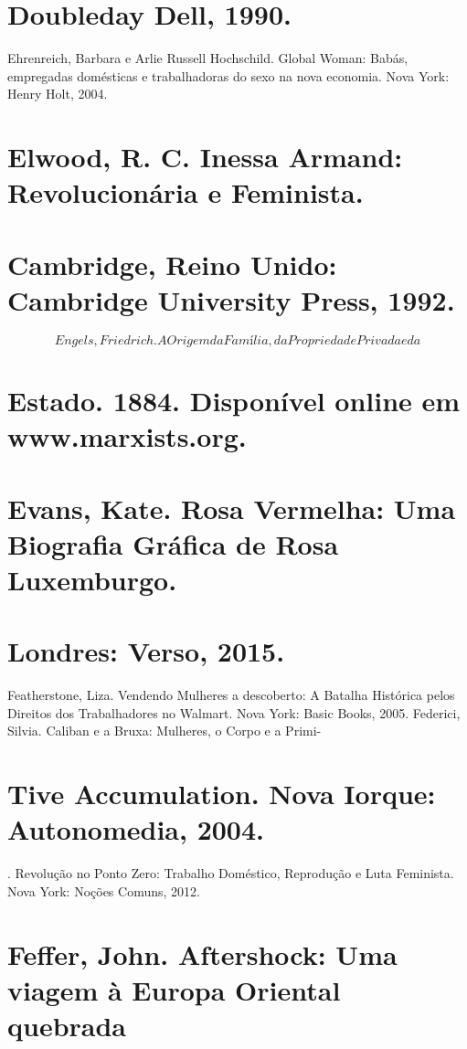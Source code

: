 \section{Doubleday Dell, 1990.}
 \par 
Ehrenreich, Barbara e Arlie Russell Hochschild. Global Woman: Babás, empregadas domésticas e trabalhadoras do sexo na nova economia. Nova York: Henry Holt, 2004.
 \par 
\section{Elwood, R. C. Inessa Armand: Revolucionária e Feminista.}
 \par 
\section{Cambridge, Reino Unido: Cambridge University Press, 1992.}
 \par 
\[Engels, Friedrich. A Origem da Família, da Propriedade Privada e da\]
 \par 
\section{Estado. 1884. Disponível online em www.marxists.org.}
 \par 
\section{Evans, Kate. Rosa Vermelha: Uma Biografia Gráfica de Rosa Luxemburgo.}
 \par 
\section{Londres: Verso, 2015.}
 \par 
Featherstone, Liza. Vendendo Mulheres a descoberto: A Batalha Histórica pelos Direitos dos Trabalhadores no Walmart. Nova York: Basic Books, 2005. Federici, Silvia. Caliban e a Bruxa: Mulheres, o Corpo e a Primi-
 \par 
\section{Tive Accumulation. Nova Iorque: Autonomedia, 2004.}
 \par 
. Revolução no Ponto Zero: Trabalho Doméstico, Reprodução e Luta Feminista. Nova York: Noções Comuns, 2012.
 \par 
\section{Feffer, John. Aftershock: Uma viagem à Europa Oriental quebrada}
 \par 
